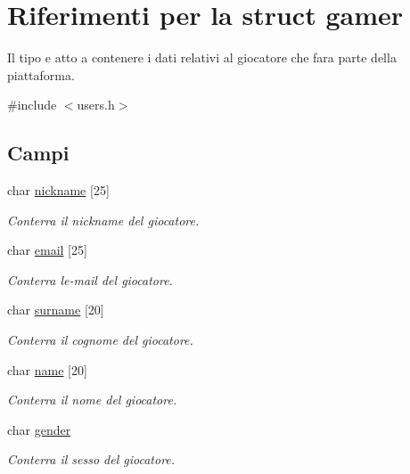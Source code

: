 \hypertarget{structgamer}{}\section{Riferimenti per la struct gamer}
\label{structgamer}


Il tipo e\textquotesingle{} atto a contenere i dati relativi al giocatore che fara\textquotesingle{} parte della piattaforma.  




{\ttfamily \#include $<$users.\+h$>$}

\subsection*{Campi}
\begin{DoxyCompactItemize}
\item 
char \hyperlink{structgamer_add226e4468980412981fd8ee76f61d85}{nickname} \mbox{[}25\mbox{]}
\begin{DoxyCompactList}\small\item\em Conterra\textquotesingle{} il nickname del giocatore. \end{DoxyCompactList}\item 
char \hyperlink{structgamer_ae73e44d41ea32b5354bd60db7928ef11}{email} \mbox{[}25\mbox{]}
\begin{DoxyCompactList}\small\item\em Conterra\textquotesingle{} l\textquotesingle{}e-\/mail del giocatore. \end{DoxyCompactList}\item 
char \hyperlink{structgamer_a57053b3442e98353ebab5a051926c7d5}{surname} \mbox{[}20\mbox{]}
\begin{DoxyCompactList}\small\item\em Conterra\textquotesingle{} il cognome del giocatore. \end{DoxyCompactList}\item 
char \hyperlink{structgamer_a0cd218f98cf7a26401782bcca0fa653e}{name} \mbox{[}20\mbox{]}
\begin{DoxyCompactList}\small\item\em Conterra\textquotesingle{} il nome del giocatore. \end{DoxyCompactList}\item 
char \hyperlink{structgamer_a4c445cd1faa7464bfb01a1745a23c85a}{gender}
\begin{DoxyCompactList}\small\item\em Conterra\textquotesingle{} il sesso del giocatore. \end{DoxyCompactList}\item 

\end{DoxyCompactItemize}
